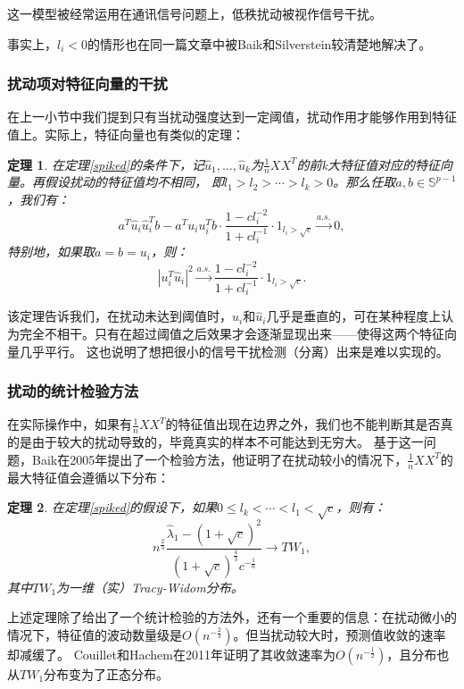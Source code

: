 \documentclass[UTF8,12pt]{ctexart}
\newtheorem{theorem}{定理}
\begin{document}
这一模型被经常运用在通讯信号问题上，低秩扰动被视作信号干扰。

事实上，$l_i<0$的情形也在同一篇文章中被Baik和Silverstein较清楚地解决了。

\subsubsection{扰动项对特征向量的干扰}
在上一小节中我们提到只有当扰动强度达到一定阈值，扰动作用才能够作用到特征值上。实际上，特征向量也有类似的定理\cite{spike2}：

\begin{theorem}
    在定理\ref{spiked}的条件下，记$\hat u_1,\ldots,\hat u_k$为$\frac{1}{n}XX^T$的前k大特征值对应的特征向量。再假设扰动的特征值均不相同，
    即$l_1 > l_2 > \cdots > l_k > 0$。那么任取$a,b \in \mathbb S^{p-1}$，我们有：
    \[
        a^T \hat u_i \hat u_i^T b - a^T u_i u_i^T b \cdot \frac{1-cl_i^{-2}}{1+cl_i^{-1}} \cdot 1_{l_i >\sqrt{c}}
        \stackrel{a.s.}{\longrightarrow} 0,
    \]
    特别地，如果取$a = b = u_i$，则：
    \[
        {|u_i^T \hat u_i|}^2 \stackrel{a.s.}{\longrightarrow} \frac{1-cl_i^{-2}}{1+cl_i^{-1}} \cdot 1_{l_i >\sqrt{c}}.
    \]
\end{theorem}

该定理告诉我们，在扰动未达到阈值时，$u_i$和$\hat u_i$几乎是垂直的，可在某种程度上认为完全不相干。只有在超过阈值之后效果才会逐渐显现出来——使得这两个特征向量几乎平行。
这也说明了想把很小的信号干扰检测（分离）出来是难以实现的。

\subsubsection{扰动的统计检验方法}
在实际操作中，如果有$\frac{1}{n}XX^T$的特征值出现在边界之外，我们也不能判断其是否真的是由于较大的扰动导致的，毕竟真实的样本不可能达到无穷大。
基于这一问题，Baik在2005年提出了一个检验方法\cite{spike3}，他证明了在扰动较小的情况下，$\frac{1}{n}XX^T$的最大特征值会遵循以下分布：
\begin{theorem}
    在定理\ref{spiked}的假设下，如果$0 \leq l_k < \cdots < l_1 < \sqrt{c}$，则有：
    \[ 
        n^{\frac{2}{3}}\frac{\hat \lambda_1 - {(1+\sqrt{c})}^2}{
            {(1+\sqrt{c})}^{\frac{4}{3}}c^{-\frac{1}{6}}
        } \rightarrow TW_1,
    \]
    其中$TW_1$为一维（实）Tracy-Widom分布。
\end{theorem}

上述定理除了给出了一个统计检验的方法外，还有一个重要的信息：在扰动微小的情况下，特征值的波动数量级是$O(n^{-\frac{2}{3}})$。但当扰动较大时，预测值收敛的速率却减缓了。
Couillet和Hachem在2011年证明了其收敛速率为$O(n^{-\frac{1}{2}})$，且分布也从$TW_1$分布变为了正态分布\cite{spike4}。
\end{document}
